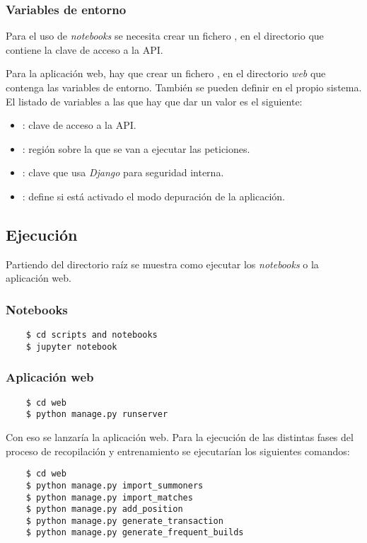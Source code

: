 \subsubsection{Variables de entorno}
Para el uso de \textit{notebooks} se necesita crear un fichero , en el directorio  que contiene la clave de acceso a la API.

Para la aplicación web, hay que crear un fichero , en el directorio \textit{web} que contenga las variables de entorno. También se pueden definir en el propio sistema. El listado de variables a las que hay que dar un valor es el siguiente:
\begin{itemize}
	\item {}: clave de acceso a la API.
	\item {}: región sobre la que se van a ejecutar las peticiones.
	\item {}: clave que usa \textit{Django} para seguridad interna.
	\item {}: define si está activado el modo depuración de la aplicación.
\end{itemize}

\subsection{Ejecución}
Partiendo del directorio raíz se muestra como ejecutar los \textit{notebooks} o la aplicación web.
\subsubsection{Notebooks}
\begin{lstlisting}
	$ cd scripts and notebooks
	$ jupyter notebook
\end{lstlisting}
\subsubsection{Aplicación web}
\begin{lstlisting}
	$ cd web
	$ python manage.py runserver
\end{lstlisting}
Con eso se lanzaría la aplicación web. Para la ejecución de las distintas fases del proceso de recopilación y entrenamiento se ejecutarían los siguientes comandos:
\begin{lstlisting}
	$ cd web
	$ python manage.py import_summoners
	$ python manage.py import_matches
	$ python manage.py add_position
	$ python manage.py generate_transaction
	$ python manage.py generate_frequent_builds
\end{lstlisting}

